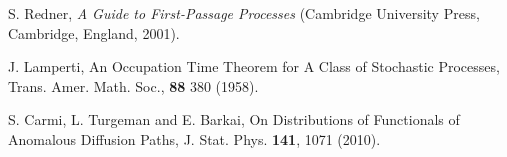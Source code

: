 \documentclass[superscriptaddress,amsmath,amssymb,aps,onecolumn]{revtex4}
\begin{document}
\begin{thebibliography}{}


S. Redner, \textit{A Guide to First-Passage Processes} (Cambridge
University Press, Cambridge, England, 2001).

J. Lamperti, An Occupation Time Theorem for A Class of Stochastic Processes, {Trans. Amer. Math. Soc.}, \textbf{88} 380 (1958).

S. Carmi, L. Turgeman  and E. Barkai, On Distributions of Functionals of Anomalous Diffusion Paths, J. Stat. Phys. \textbf{141}, 1071 (2010).

\end{thebibliography}
\end{document}
